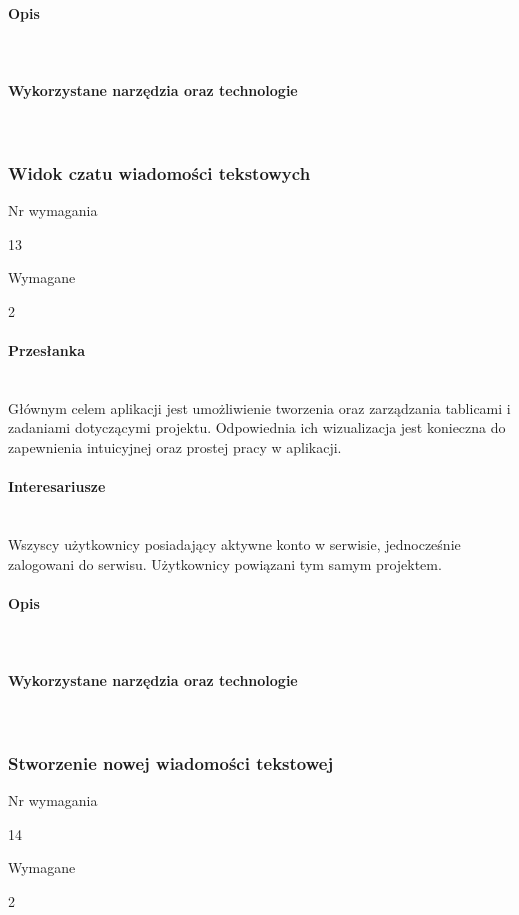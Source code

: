 \documentclass[eng,printmode]{mgr}
\begin{document}
\paragraph{Opis}\ \\

\paragraph{Wykorzystane narzędzia oraz technologie}\ \\
\newpage

\subsubsection{Widok czatu wiadomości tekstowych}
\begin{labeling}{Nr wymagania}
\item [Nr wymagania:] 13
\item [Typ:] Wymagane
\item [Powiązania:] 2
\end{labeling}

\paragraph{Przesłanka}\ \\
Głównym celem aplikacji jest umożliwienie tworzenia oraz zarządzania tablicami i zadaniami dotyczącymi projektu. Odpowiednia ich wizualizacja jest konieczna do zapewnienia intuicyjnej oraz prostej pracy w aplikacji.

\paragraph{Interesariusze}\ \\
Wszyscy użytkownicy posiadający aktywne konto w serwisie, jednocześnie zalogowani do serwisu. Użytkownicy powiązani tym samym projektem.

\paragraph{Opis}\ \\

\paragraph{Wykorzystane narzędzia oraz technologie}\ \\
\newpage

\subsubsection{Stworzenie nowej wiadomości tekstowej}
\begin{labeling}{Nr wymagania}
\item [Nr wymagania:] 14
\item [Typ:] Wymagane
\item [Powiązania:] 2
\end{labeling}
\end{document}
